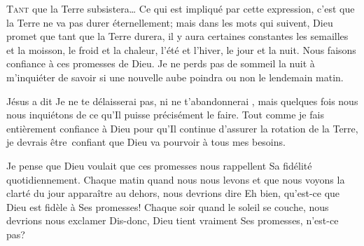 \dvrule






\lettrine[ante=\Og]{T}{ant} que la Terre subsistera\dots{} \Fg{} Ce qui est
 impliqué par cette expression, c'est que la Terre ne va pas durer éternellement;
 mais dans les mots qui suivent, Dieu promet que tant que la Terre durera, il y
 aura certaines constantes\frcolon{} les semailles et la moisson, le froid et la chaleur,
 l'été et l'hiver, le jour et la nuit. Nous faisons confiance à ces promesses de
 Dieu. Je ne perds pas de sommeil la nuit à m'inquiéter de savoir si une nouvelle
 aube poindra ou non le lendemain matin. 


Jésus a dit\frcolon{} 
 \Og Je ne te délaisserai pas, ni ne t'abandonnerai \Fg{}, mais
 quelques fois nous nous inquiétons de ce qu'Il puisse précisément le faire.
 Tout comme je fais entièrement confiance à Dieu pour qu'Il continue d'assurer
 la rotation de la Terre, je devrais être~confiant que Dieu va pourvoir à tous
 mes besoins.

Je pense que Dieu voulait que ces promesses nous rappellent Sa fidélité
 quotidiennement. Chaque matin quand nous nous levons et que nous voyons la
 clarté du jour apparaître au dehors, nous devrions dire\frcolon{} \Og Eh bien, qu'est-ce
 que Dieu est fidèle à Ses promesses! \Fg{} Chaque soir quand le soleil se
 couche, nous devrions nous exclamer\frcolon{} \Og Dis-donc, Dieu tient vraiment Ses
 promesses, n'est-ce pas? \Fg{}

